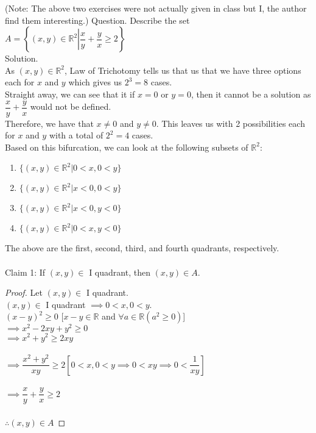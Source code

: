 \hrulefill


\hrulefill

(Note: The above two exercises were not actually given in class but I, the author find them interesting.)
\newpage
Question. Describe the set $A = \left\{(x, y) \in \mathbb{R}^2\left|\dfrac{x}{y}+\dfrac{y}{x} \ge 2\right.\right\}$\\
Solution.\\
As $(x, y)\in \mathbb{R}^2$, Law of Trichotomy tells us that us that we have three options each for $x$ and $y$ which gives us $2^3=8$ cases.\\
Straight away, we can see that it if $x=0$ or $y=0$, then it cannot be a solution as $\dfrac{x}{y}+\dfrac{y}{x}$ would not be defined.\\
Therefore, we have that $x\neq 0$ and $y\neq0$. This leaves us with 2 possibilities each for $x$ and $y$ with a total of $2^2=4$ cases.\\
Based on this bifurcation, we can look at the following subsets of $\mathbb{R}^2$:
\begin{enumerate}[nosep]
    \item $\{(x, y) \in \mathbb{R}^2|0 < x, 0 < y\}$
    \item $\{(x, y) \in \mathbb{R}^2|x < 0, 0 < y\}$
    \item $\{(x, y) \in \mathbb{R}^2|x < 0, y < 0\}$
    \item $\{(x, y) \in \mathbb{R}^2|0 < x, y < 0\}$
\end{enumerate}
The above are the first, second, third, and fourth quadrants, respectively.\\~\\
%
%
Claim 1: If $(x, y) \in$ I quadrant, then $(x, y) \in A$.
\begin{proof}
Let $(x, y) \in$ I quadrant.\\
$(x, y) \in$ I quadrant $\implies 0 < x, 0 < y$.\\
$(x-y)^2 \ge 0$ \hfill [$x-y \in \mathbb{R}$ and $\forall a \in \mathbb{R}(a^2 \ge 0)$]\\
$\implies x^2 - 2xy + y^2 \ge 0$\\
$\implies x^2 + y^2 \ge 2xy$\\~\\
$\implies \dfrac{x^2+y^2}{xy} \ge 2$\hfill $\left[0 < x, 0 < y \implies 0 < xy \implies 0 < \dfrac{1}{xy}\right]$\\~\\
$\implies \dfrac{x}{y} + \dfrac{y}{x} \ge 2$\\~\\
$\therefore (x, y) \in A$
\end{proof}
